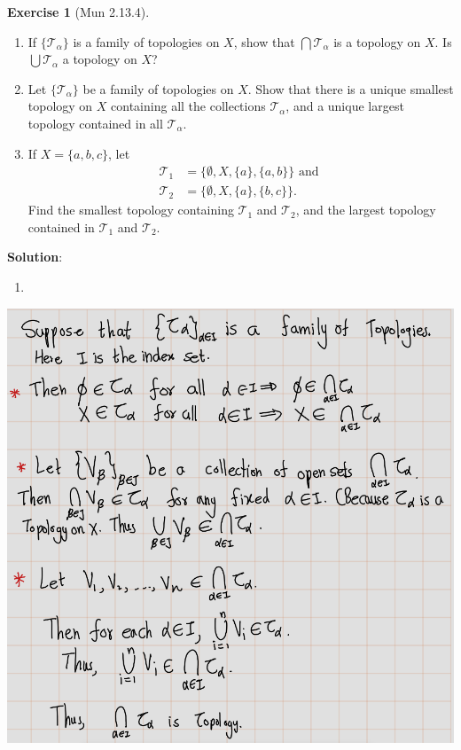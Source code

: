 \documentclass[
]{book}
\providecommand{\tightlist}{%
  \setlength{\itemsep}{0pt}\setlength{\parskip}{0pt}}
\theoremstyle{definition}
\theoremstyle{definition}
\theoremstyle{definition}
\newtheorem{exercise}{Exercise}[chapter]
\theoremstyle{definition}
\theoremstyle{remark}
\begin{document}
\begin{exercise}[Mun 2.13.4]
\protect\hypertarget{exr:unnamed-chunk-100}{}\label{exr:unnamed-chunk-100}\leavevmode

\begin{enumerate}
\def\labelenumi{(\alph{enumi})}
\tightlist
\item
  If \(\{\mathcal{T}_\alpha\}\) is a family of topologies on \(X\), show that \(\bigcap \mathcal{T}_\alpha\) is a topology on \(X\). Is \(\bigcup \mathcal{T}_\alpha\) a topology on \(X\)?
\item
  Let \(\{\mathcal{T}_\alpha\}\) be a family of topologies on \(X\). Show that there is a unique smallest topology on \(X\) containing all the collections \(\mathcal{T}_\alpha\), and a unique largest topology contained in all \(\mathcal{T}_\alpha\).
\item
  If \(X = \{a, b, c\}\), let
  \begin{align*}
  \mathcal{T}_1 &= \{\emptyset, X,\{a\},\{a, b\}\} \text{ and } \\
  \mathcal{T}_2 &= \{\emptyset, X,\{a\},\{b, c\}\}.
  \end{align*}
  Find the smallest topology containing \(\mathcal{T}_1\) and \(\mathcal{T}_2\), and the largest topology contained in \(\mathcal{T}_1\) and \(\mathcal{T}_2\).
\end{enumerate}

\end{exercise}

\textbf{Solution}:

\begin{enumerate}
\def\labelenumi{\alph{enumi})}
\tightlist
\item
\end{enumerate}

\includegraphics{figures/Exercises/Ex 2.13/ex-4-1.png}
\end{document}
